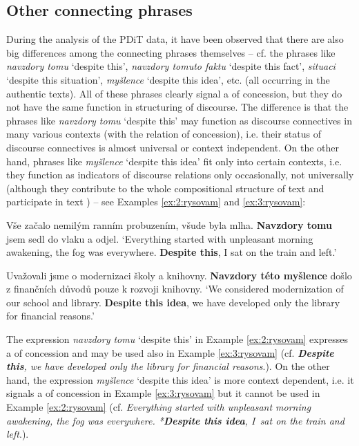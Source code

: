 \documentclass[output=paper]{langsci/langscibook.cls}
\begin{document}
\subsection{Other connecting phrases}

During the analysis of the PDiT data, it have been observed that there are also big differences among the  connecting phrases themselves -- cf. the phrases like \textit{navzdory tomu} `despite this', \textit{navzdory tomuto faktu} `despite this fact', \textit{ situaci} `despite this situation', \textit{ myšlence} `despite this idea', etc. (all occurring in the authentic  texts). All of these phrases clearly signal a  of concession, but they do not have the same function in structuring of discourse. The difference is that the phrases like \textit{navzdory tomu} `despite this' may function as discourse connectives in many various contexts (with the relation of concession), i.e. their status of discourse connectives is almost universal or context independent. On the other hand, phrases like \textit{ myšlence} `despite this idea' fit only into certain contexts, i.e. they function as indicators of discourse relations only occasionally, not universally (although they contribute to the whole compositional structure of text and participate in text ) – see Examples \ref{ex:2:rysovam} and \ref{ex:3:rysovam}:

\ea
\label{ex:2:rysovam}
 Vše začalo nemilým ranním probuzením, všude byla mlha. \textbf{Navzdory tomu}  jsem sedl do vlaku a odjel. 
\glt `Everything started with unpleasant morning awakening, the fog was everywhere. \textbf{Despite this}, I sat on the train and left.'
\z

\ea
\label{ex:3:rysovam}
Uvažovali jsme o modernizaci školy a knihovny. \textbf{Navzdory této myšlence} došlo z finančních důvodů pouze k rozvoji knihovny.
\glt `We considered modernization of our school and library. \textbf{Despite this idea}, we have developed only the library for financial reasons.'
\z

The expression \textit{navzdory tomu} `despite this' in Example \ref{ex:2:rysovam} expresses a  of concession and may be used also in Example \ref{ex:3:rysovam} (cf. \textbf{\textit{Despite this}}\textit{, we have developed only the library for financial reasons}.). On the other hand, the expression \textit{ myšlence} `despite this idea' is more context dependent, i.e. it signals a  of concession in Example \ref{ex:3:rysovam} but it cannot be used in Example \ref{ex:2:rysovam} (cf. \textit{Everything started with unpleasant morning awakening, the fog was everywhere. *}\textbf{\textit{Despite this idea}}\textit{, I~sat on the train and left}.).
\end{document}
